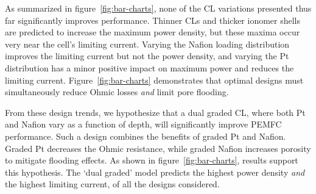 \documentclass[final,3p,times,twocolumn]{elsarticle}    %
\begin{document}

As summarized in figure~\ref{fig:bar-charts}, none of the CL variations presented thus far significantly improves performance. Thinner CLs and thicker ionomer shells are predicted to increase the maximum power density, but these maxima occur very near the cell's limiting current. Varying the Nafion loading distribution improves the limiting current but not the power density, and varying the Pt distribution has a minor positive impact on maximum power and reduces the limiting current. Figure~\ref{fig:bar-charts} demonstrates that optimal designs must simultaneously reduce Ohmic losses \emph{and} limit pore flooding.

From these design trends, we hypothesize that a dual graded CL, where both Pt and Nafion vary as a function of depth, will significantly improve PEMFC performance. Such a design combines the benefits of graded Pt and Nafion. Graded Pt decreases the Ohmic resistance, while graded Nafion increases porosity to mitigate flooding effects. As shown in figure~\ref{fig:bar-charts}, results support this hypothesis. The `dual graded' model predicts the highest power density \emph{and} the highest limiting current, of all the designs considered.
\end{document}
